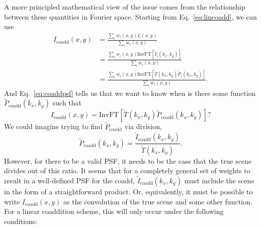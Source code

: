 \documentclass[modern]{style_and_logos/lsstdescnote}
\begin{document}
 
 A more principled mathematical view of the issue comes from the relationship between these quantities in Fourier space.  Starting from Eq.~\eqref{eq:lincoadd}, we can use
 \begin{align*}
     I_\text{coadd}(x,y) &= \frac{\sum_i w_i(x,y) I_i(x,y)}{\sum_i w_i(x,y)} \\
     &= \frac{\sum_i w_i(x,y) \text{InvFT}[\widetilde{I}_i(k_x,k_y)]}{\sum_i w_i(x,y)}\\
     &= \frac{\sum_i w_i(x,y) \text{InvFT}[\widetilde{T}(k_x,k_y)\widetilde{P}_i(k_x,k_y)]}{\sum_i w_i(x,y)}.
 \end{align*}
And Eq.~\eqref{eq:coaddpsf} tells us that we want to know when is there some function $\widetilde{P}_\text{coadd}(k_x,k_y)$ such that
\begin{equation*}
    I_\text{coadd}(x,y) = \text{InvFT}[\widetilde{T}(k_x,k_y)\widetilde{P}_\text{coadd}(k_x,k_y)]?
\end{equation*}
We could imagine trying to find $\widetilde{P}_\text{coadd}$ via division,
\begin{equation}\label{eq:fourier_solve}
    \widetilde{P}_\text{coadd}(k_x,k_y) = \frac{\widetilde{I}_\text{coadd}(k_x,k_y)}{\widetilde{T}(k_x,k_y)}.
\end{equation}
However, for there to be a valid PSF, it needs to be the case that the true scene divides out of this ratio.  It seems that for a completely general set of weights to result in a well-defined PSF for the coadd, $\widetilde{I}_\text{coadd}(k_x,k_y)$ must include the scene in the form of a straightforward product.  Or, equivalently, it must be possible to write $I_\text{coadd}(x,y)$ as the convolution of the true scene and some other function.   For a linear coaddition scheme, this will only occur under the following conditions:
\end{document}
